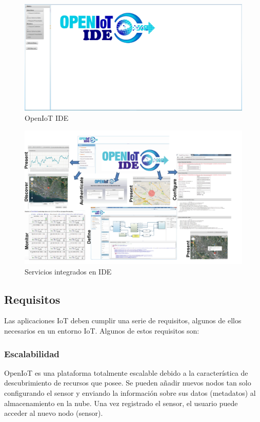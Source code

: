 \documentclass[12pt, twoside]{book}
\begin{document}
\begin{figure}[H]
\centering
\includegraphics[scale=0.3]{images/idecore_figure}
\caption{OpenIoT IDE}\label{L0421}
\end{figure}

\begin{figure}[H]
\centering
\includegraphics[scale=0.55]{images/idecoretools_capture}
\caption{Servicios integrados en IDE}\label{L0421}
\end{figure}

\subsection{Requisitos}
Las aplicaciones IoT deben cumplir una serie de requisitos, algunos de ellos necesarios en un entorno IoT. Algunos de estos requisitos son:

\subsubsection*{Escalabilidad}
OpenIoT es una plataforma totalmente escalable debido a la característica de descubrimiento de recursos que posee. Se pueden añadir nuevos nodos tan solo configurando el sensor y enviando la información sobre sus datos (metadatos) al almacenamiento en la nube. Una vez registrado el sensor, el usuario puede acceder al nuevo nodo (sensor).
\end{document}
